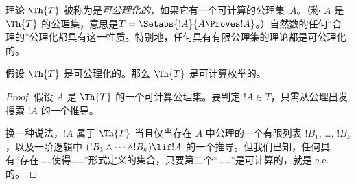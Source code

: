 \documentclass[../../../include/open-logic-section]{subfiles}
\begin{document}


理论 $\Th{T}$ 被称为是\emph{可公理化的}，如果它有一个可计算的公理集~$A$。（称 $A$ 是 $\Th{T}$ 的公理集，意思是$T = \Setabs{!A}{A \Proves !A}$。）自然数的任何“合理的”公理化都具有这一性质。特别地，任何具有有限公理集的理论都是可公理化的。

\begin{lem}
假设 $\Th{T}$ 是可公理化的。那么 $\Th{T}$ 是可计算枚举的。
\end{lem}

\begin{proof}
假设 $A$ 是 $\Th{T}$ 的一个可计算公理集。要判定 $!A \in T$，只需从公理出发搜索 $!A$ 的一个推导。

换一种说法，$!A$ 属于 $\Th{T}$ 当且仅当存在 $A$ 中公理的一个有限列表 $!B_1$, \dots, $!B_k$，以及一阶逻辑中 $(!B_1 \land \dots \land !B_k) \lif !A$ 的一个推导。但我们已知，任何具有“存在……使得……”形式定义的集合，只要第二个“……”是可计算的，就是 c.e.\@ 的。
\end{proof}
\end{document}
